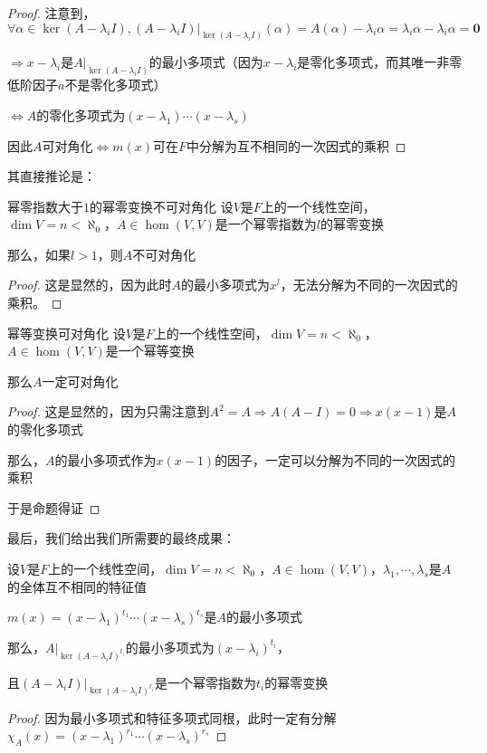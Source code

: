 \documentclass[12pt, a4paper, oneside, UTF8]{ctexbook}
\begin{document}
\begin{para}{0}
\begin{proof}
						注意到，$\forall \alpha \in \ker (A-\lambda_i I),(A-\lambda_i I)|_{\ker (A-\lambda_i I)}(\alpha )=A(\alpha )-\lambda_i \alpha =\lambda_i \alpha -\lambda_i \alpha = \mathbf{0}$

						$\Rightarrow x-\lambda_i$是$A|_{\ker (A-\lambda_i I)}$的最小多项式（因为$x-\lambda_i$是零化多项式，而其唯一非零低阶因子$a$不是零化多项式）

						$\Leftrightarrow A$的零化多项式为$(x-\lambda_1)\cdots(x-\lambda_s)$

						因此$A$可对角化$\Leftrightarrow m(x)$可在$F$中分解为互不相同的一次因式的乘积
					\end{proof}
					其直接推论是：
					\begin{corollary}{幂零指数大于$1$的幂零变换不可对角化}{}
						设$V$是$F$上的一个线性空间，$\dim V = n < \aleph_0$，$A \in \hom(V,V)$是一个幂零指数为$l$的幂零变换

						那么，如果$l >1$，则$A$不可对角化
					\end{corollary}
					\begin{proof}
						这是显然的，因为此时$A$的最小多项式为$x^l$，无法分解为不同的一次因式的乘积。
					\end{proof}
					\begin{corollary}{幂等变换可对角化}{}
						设$V$是$F$上的一个线性空间，$\dim V = n < \aleph_0$，$A \in \hom(V,V)$是一个幂等变换

						那么$A$一定可对角化
					\end{corollary}
					\begin{proof}
						这是显然的，因为只需注意到$A^2=A \Rightarrow A(A-I)=0 \Rightarrow x(x-1)$是$A$的零化多项式

						那么，$A$的最小多项式作为$x(x-1)$的因子，一定可以分解为不同的一次因式的乘积

						于是命题得证
					\end{proof}
				\point{}
					最后，我们给出我们所需要的最终成果：
					\begin{proposition}
						设$V$是$F$上的一个线性空间，$\dim V = n < \aleph_0$，$A \in \hom(V,V)$，$\lambda_1,\cdots,\lambda_s$是$A$的全体互不相同的特征值
						
						$m(x)=(x-\lambda_1)^{t_1}\cdots (x-\lambda_s)^{t_s}$是$A$的最小多项式

						那么，$A|_{\ker (A-\lambda_i I)^{t_i}}$的最小多项式为$(x-\lambda_i)^{t_i}$，

						且$(A-\lambda_i I)|_{\ker (A-\lambda_i I)^{t_i}}$是一个幂零指数为$t_i$的幂零变换
					\end{proposition}
					\begin{proof}
						因为最小多项式和特征多项式同根，此时一定有分解$\chi_A(x)=(x-\lambda_1)^{r_1}\cdots(x-\lambda_s)^{r_s}$


\end{proof}
\end{para}
\end{document}
